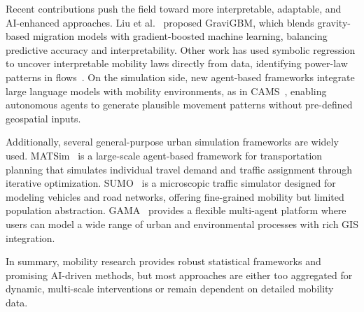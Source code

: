 Recent contributions push the field toward more interpretable, adaptable, and AI-enhanced approaches. Liu et al.~\cite{liu2024GraviGBM} proposed GraviGBM, which blends gravity-based migration models with gradient-boosted machine learning, balancing predictive accuracy and interpretability. Other work has used symbolic regression to uncover interpretable mobility laws directly from data, identifying power-law patterns in flows~\cite{guo2025datadrivendiscoveryhuman}. %
On the simulation side, new agent-based frameworks integrate large language models with mobility environments, as in CAMS~\cite{du2025camscitygptpoweredagenticframework}, enabling autonomous agents to generate plausible movement patterns without pre-defined geospatial inputs.

Additionally, several general-purpose urban simulation frameworks are widely used. MATSim~\cite{balmer2009matsim} is a large-scale agent-based framework for transportation planning that simulates individual travel demand and traffic assignment through iterative optimization. SUMO~\cite{krajzewicz2012sumo} is a microscopic traffic simulator designed for modeling vehicles and road networks, offering fine-grained mobility but limited population abstraction. GAMA~\cite{taillandier2019gama} provides a flexible multi-agent platform where users can model a wide range of urban and environmental processes with rich GIS integration.

In summary, mobility research provides robust statistical frameworks and promising AI-driven methods, but most approaches are either too aggregated for dynamic, multi-scale interventions or remain dependent on detailed mobility data.


